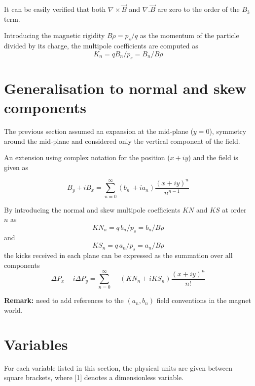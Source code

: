 It can be easily verified that both \(\nabla \times \vec{B}\)
and \(\nabla . \vec{B}\) are zero to the order of the
\(B_3\) term.  

Introducing the magnetic rigidity \(B \rho = p_s / q\) as the
momentum of the particle divided by its charge, the multipole
coefficients are computed as
\begin{equation}\label{eq:kn}
K_n = q B_n / p_s  =  B_n / B \rho 
\end{equation}

\section{Generalisation to normal and skew components}
\label{sec:normalskew}
The previous section assumed an expansion at the mid-plane ($y=0$), 
symmetry around the mid-plane and considered only the vertical 
component of the field. 

An extension using complex notation for the position ($x + i y$) 
and the field is given as

\begin{equation}
B_y +  i B_x =\sum_{n=0}^{\infty} (b_n\,+ia_n) \frac{(x+iy)^n}{n^{n-1}}
\end{equation}

By introducing the normal and skew multipole coefficients 
$KN$ and $KS$ at order $n$ as
\begin{equation}\label{eq:knn}
KN_n = q\,b_n / p_s  =  b_n / B \rho 
\end{equation}
and
\begin{equation}\label{eq:kns}
KS_n = q\,a_n / p_s  =  a_n / B \rho 
\end{equation}
the kicks received in each plane can be expressed as the summation 
over all components
\begin{equation}
\Delta P_x - i \Delta P_y = \sum_{n=0}^{\infty} -(KN_n + i KS_n) \frac{(x+iy)^n}{n!}
\end{equation}

\textbf{Remark:} need to add references to the $(a_n,b_n)$ field conventions 
in the magnet world. 


\section{Variables}
\label{sec:variables}

For each variable listed in this section, the physical units are given
between square brackets, where [1] denotes a dimensionless variable.


